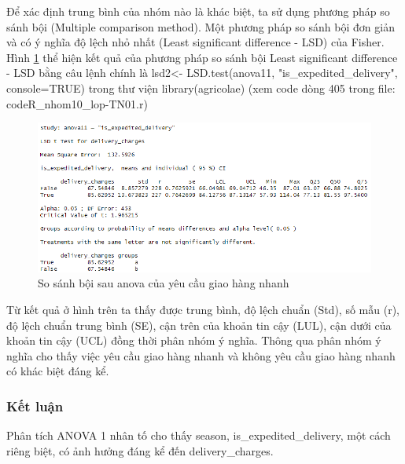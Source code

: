 Để xác định trung bình của nhóm nào là khác biệt, ta sử dụng phương pháp so sánh bội (Multiple comparison method). Một phương pháp so sánh bội đơn giản và có ý nghĩa độ lệch nhỏ nhất (Least significant difference - LSD) của Fisher. Hình \ref{fig:5.4} thể hiện kết quả của phương pháp so sánh bội Least significant difference - LSD bằng câu lệnh chính là lsd2<- LSD.test(anova11, "is\_expedited\_delivery", console=TRUE)
trong thư viện library(agricolae) (xem code dòng 405 trong file: codeR\_nhom10\_lop-TN01.r)
\begin{figure}[!htbp]
    \centering
    \includegraphics[width=0.6\linewidth]{graphics/5.3.4.png}
    \caption{So sánh bội sau anova của yêu cầu giao hàng nhanh}
    \label{fig:5.4}
\end{figure}

Từ kết quả ở hình trên ta thấy được trung bình, độ lệch chuẩn (Std), số mẫu (r), độ lệch chuẩn trung bình (SE), cận trên của khoản tin cậy (LUL), cận dưới của khoản tin cậy (UCL) đồng thời phân nhóm ý nghĩa. Thông qua phân nhóm ý nghĩa cho thấy việc yêu cầu giao hàng nhanh và không yêu cầu giao hàng nhanh có khác biệt đáng kể.

\subsubsection{Kết luận}
Phân tích ANOVA 1 nhân tố cho thấy season, is\_expedited\_delivery, một cách riêng biệt, có ảnh hưởng đáng kể đến delivery\_charges.